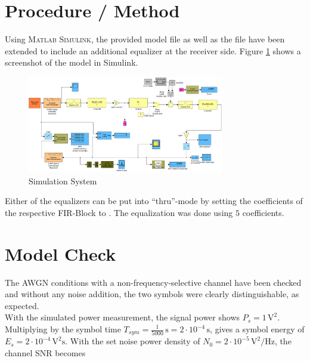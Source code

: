 \documentclass[10pt, a4paper]{article}
\begin{document}


\section{Procedure / Method}
Using \textsc{Matlab Simulink}\texttrademark{}, the provided model file  as well as the  file have been extended to include an additional equalizer at the receiver side. Figure \ref{fig:system_screenshot} shows a screenshot of the model in Simulink.\\

\begin{figure}[H]
\centering
\includegraphics[width=0.764\textwidth]{graphics/system_screenshot.pdf}
\caption{Simulation System}\label{fig:system_screenshot}
\end{figure}

Either of the equalizers can be put into ``thru''-mode by setting the coefficients of the respective FIR-Block to \inlinecodee{[ 1 0 0 ... 0 0 0 ]}. The equalization was done using $5$ coefficients.

\section{Model Check}

The AWGN conditions with a non-frequency-selective channel have been checked and without any noise addition, the two symbols were clearly distinguishable, as expected.\\

With the simulated power measurement, the signal power shows $P_{s} = 1\, \si{\volt\squared}$. Multiplying by the symbol time $T_{sym} = \frac{1}{5000}\,\si{\second} = 2\cdot 10^{-4}\,\si{\second}$, gives a symbol energy of $E_{s} = 2\cdot 10^{-4}\,\si{\volt\squared\second}$. With the set noise power density of $N_{0} = 2\cdot 10^{-5}\,\si{\volt\squared\per\hertz}$, the channel SNR becomes
\end{document}
